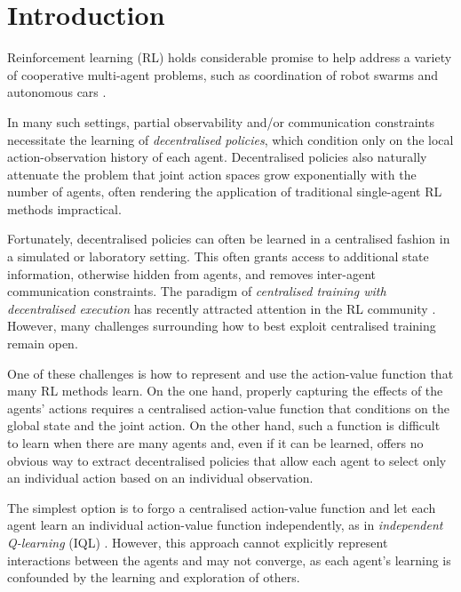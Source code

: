 \documentclass[twoside,11pt]{article}
\renewcommand{\cite}{\citep}
\begin{document}
\section{Introduction}
\label{sec:intro}

Reinforcement learning (RL) holds considerable promise to help address a variety of cooperative multi-agent problems, such as coordination of robot swarms \cite{huttenrauch_guided_2017} and autonomous cars \cite{cao_overview_2012}. 

In many such settings, partial observability and/or communication constraints necessitate the learning of \textit{decentralised policies}, which condition only on the local action-observation history of each agent. Decentralised policies also naturally attenuate the problem that joint action spaces grow exponentially with the number of agents, often rendering the application of traditional single-agent RL methods impractical.

Fortunately, decentralised policies can often be learned in a centralised fashion in a simulated or laboratory setting. This often grants access to additional state information, otherwise hidden from agents, and removes inter-agent communication constraints. 
The paradigm of \textit{centralised training with decentralised execution} \cite{oliehoek_optimal_2008,kraemer_multi-agent_2016} has recently attracted attention in the RL community \cite{jorge_learning_2016,foerster_counterfactual_2017}. 
However, many challenges surrounding how to best exploit centralised training remain open.

One of these challenges is how to represent and use the action-value function 
that many RL methods learn.  On the one hand, properly capturing the effects of 
the agents' actions requires a centralised action-value function  that 
conditions on the global state and the joint action.  On the other hand, such a 
function is difficult to learn when there are many agents and, even if it can 
be learned, offers no obvious way to extract decentralised policies that allow 
each agent to select only an individual action based on an individual 
observation.

The simplest option is to forgo a centralised action-value function and let each agent  learn an individual action-value function  independently, as in \emph{independent Q-learning} (IQL) \cite{tan_multi-agent_1993}.  However, this approach cannot explicitly represent interactions between the agents and may not converge, as each agent's learning is confounded by the learning and exploration of others.
\end{document}
